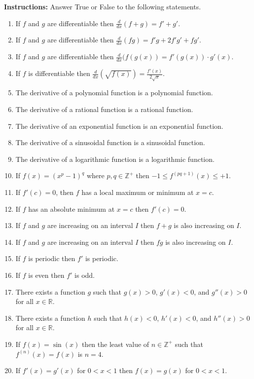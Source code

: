 \documentclass[12pt]{book}
\begin{document}
\textbf{Instructions:} Answer True or False to the following statements.

\begin{enumerate}
\item  If $f$ and $g$ are differentiable then $\frac{d}{dx} (f+g) = f' + g'$.
\item If $f$ and $g$ are differentiable then $\frac{d}{dx} (fg) = f'g+2f'g'+fg'$.
\item If $f$ and $g$ are differentiable then $\frac{d}{dx} (f(g(x)) = f'(g(x)) \cdot g'(x)$.
\item If $f$ is differentiable then $\frac{d}{dx} (\sqrt{f(x)}) = \frac{f'(x)}{2\sqrt{x}}$.
\item The derivative of a polynomial function is a polynomial function.
\item The derivative of a rational function is a rational function.
\item The derivative of an exponential function is an exponential function.
\item The derivative of a sinusoidal function is a sinusoidal function.
\item The derivative of a logarithmic function is a logarithmic function.
\item If $f(x) = (x^p - 1)^q$ where $p,q \in \mathbb{Z^+}$ then $-1 \le f^{(pq+1)}(x) \le +1$.
\item If $f'(c)=0$, then $f$ has a local maximum or minimum at $x=c$.
\item If $f$ has an absolute minimum at $x=c$ then $f'(c) = 0$. 
\item If $f$ and $g$ are increasing on an interval $I$ then $f+g$ is also increasing on $I$.
\item If $f$ and $g$ are increasing on an interval $I$ then $fg$ is also increasing on $I$.
\item If $f$ is periodic then $f'$ is periodic.
\item If $f$ is even then $f'$ is odd.
\item There exists a function $g$ such that $g(x)>0$, $g'(x)<0$, and $g''(x)>0$ for all $x \in \mathbb{R}$.
\item There exists a function $h$ such that $h(x)<0$, $h'(x)<0$, and $h''(x)>0$ for all $x \in \mathbb{R}$.
\item If $f(x)=\sin(x)$ then the least value of $n \in \mathbb{Z^+}$ such that $f^{(n)}(x) = f(x)$ is $n=4$.
\item If $f'(x) = g'(x) $ for $0 < x < 1$ then $f(x) = g(x)$ for $0 < x < 1$.
\newpage


\end{enumerate}
\end{document}
